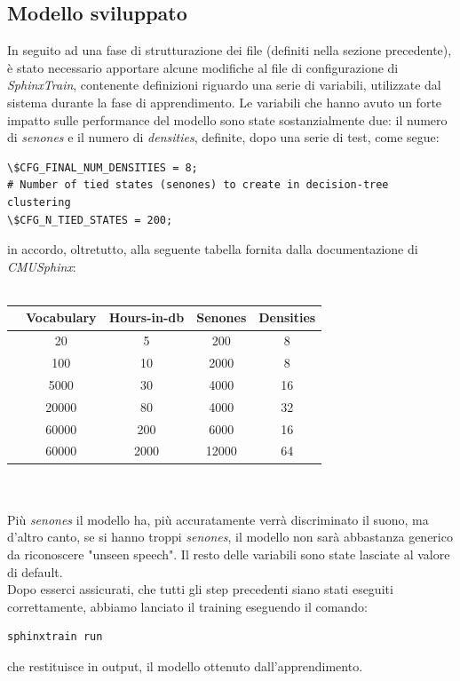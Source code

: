 \documentclass[12pt]{article}
\begin{document}
    \subsection{Modello sviluppato}
    In seguito ad una fase di strutturazione dei file (definiti nella sezione precedente), è stato necessario apportare alcune modifiche al file di configurazione di \textit{SphinxTrain}, contenente definizioni riguardo una serie di variabili, utilizzate dal sistema durante la fase di apprendimento.
    Le variabili che hanno avuto un forte impatto sulle performance del modello sono state sostanzialmente due: il numero di \textit{senones} e il numero di \textit{densities}, definite, dopo una serie di test, come segue:
    \begin{lstlisting}
\$CFG_FINAL_NUM_DENSITIES = 8;
# Number of tied states (senones) to create in decision-tree clustering
\$CFG_N_TIED_STATES = 200;
    \end{lstlisting}
    in accordo, oltretutto, alla seguente tabella fornita dalla documentazione di \textit{CMUSphinx}:\\ \\
    \begin{tabular}{r|c|c|c|c|}
        &Vocabulary&Hours-in-db&Senones&Densities\\ \hline
        &20&5&200&8\\ \hline
        &100&10&2000&8\\ \hline
        &5000&30&4000&16\\ \hline
        &20000&80&4000&32\\ \hline
        &60000&200&6000&16\\ \hline
        &60000&2000&12000&64\\ \hline
        \end{tabular}
    \\ \\ Più \textit{senones} il modello ha, più accuratamente verrà discriminato il suono, ma d'altro canto, se si hanno troppi \textit{senones}, il modello non sarà abbastanza generico da riconoscere "unseen speech". Il resto delle variabili sono state lasciate al valore di default.\\
    Dopo esserci assicurati, che tutti gli step precedenti siano stati eseguiti correttamente, abbiamo lanciato il training eseguendo il comando:
     \begin{lstlisting}
sphinxtrain run
    \end{lstlisting}
    che restituisce in output, il modello ottenuto dall'apprendimento.
\end{document}

